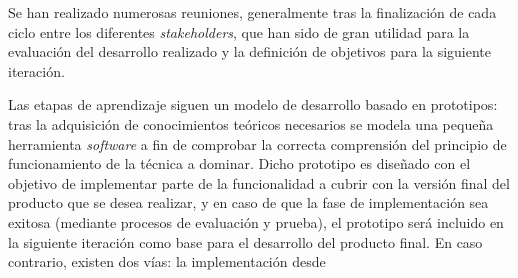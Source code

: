 Se han realizado numerosas reuniones, generalmente tras la finalización de cada ciclo entre los diferentes \textit{stakeholders}, que han sido de gran utilidad para la evaluación del desarrollo realizado y la definición de objetivos para la siguiente iteración.

Las etapas de aprendizaje siguen un modelo de desarrollo basado en prototipos: tras la adquisición de conocimientos teóricos necesarios se modela una pequeña herramienta \textit{software} a fin de comprobar la correcta comprensión del principio de funcionamiento de la técnica a dominar. Dicho prototipo es diseñado con el objetivo de implementar parte de la funcionalidad a cubrir con la versión final del producto que se desea realizar, y en caso de que la fase de implementación sea exitosa (mediante procesos de evaluación y prueba), el prototipo será incluido en la siguiente iteración como base para el desarrollo del producto final. En caso contrario, existen dos vías: la implementación desde %


